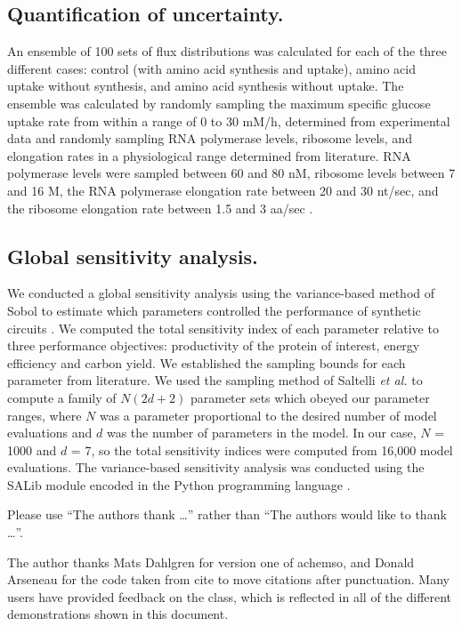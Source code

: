 \documentclass[journal=asbcd6,manuscript=article]{achemso}
\begin{document}
\subsection*{Quantification of uncertainty.}
An ensemble of 100 sets of flux distributions was calculated for each of the three different cases: control (with amino acid synthesis and uptake), amino acid uptake without synthesis, and amino acid synthesis without uptake.
The ensemble was calculated by randomly sampling the maximum specific glucose uptake rate from within a range of 0 to 30 mM/h, determined from experimental data and randomly sampling RNA polymerase levels, ribosome levels, and elongation rates in a physiological range determined from literature.
RNA polymerase levels were sampled between 60 and 80 nM, ribosome levels between 7 and 16 \textmu M, the RNA polymerase elongation rate between 20 and 30 nt/sec, and the ribosome elongation rate between 1.5 and 3 aa/sec \cite{2005_underwood_biotech, Garamella:2016aa}.

\subsection*{Global sensitivity analysis.}
We conducted a global sensitivity analysis using the variance-based method of Sobol to estimate which parameters controlled the performance of synthetic circuits \citep{SOBOL_METHOD}.
We computed the total sensitivity index of each parameter relative to three performance objectives: productivity of the protein of interest, energy efficiency and carbon yield.
We established the sampling bounds for each parameter from literature.
We used the sampling method of Saltelli \textit{et al.} \citep{Saltelli:2010} to compute a family of $N\left(2d+2\right)$ parameter sets which obeyed our parameter ranges,
where $N$ was a parameter proportional to the desired number of model evaluations and $d$ was the number of parameters in the model. In our case, $N$ = 1000 and $d$ = 7, so the total sensitivity indices were computed from 16,000 model evaluations. The variance-based sensitivity analysis was conducted using the SALib module encoded in the Python programming language \citep{SALIB}.

\begin{acknowledgement}

Please use ``The authors thank \ldots'' rather than ``The
authors would like to thank \ldots''.

The author thanks Mats Dahlgren for version one of \textsf{achemso},
and Donald Arseneau for the code taken from \textsf{cite} to move
citations after punctuation. Many users have provided feedback on the
class, which is reflected in all of the different demonstrations
shown in this document.

\end{acknowledgement}
\end{document}
